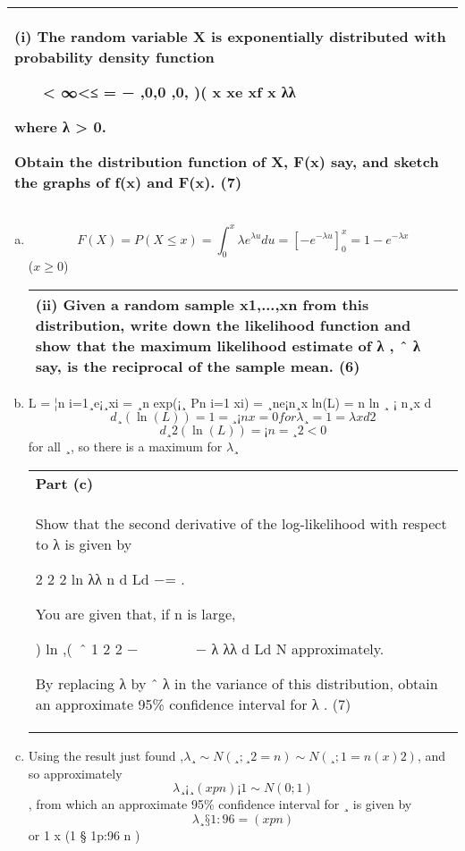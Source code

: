 \documentclass[a4paper,12pt]{article}
\begin{document}
  \begin{table}[ht!]
  \centering
  \begin{tabular}{|p{15cm}|}
  \hline
(i) The random variable X is exponentially distributed with probability density function 
 
   
  
< ∞<≤
=
−
,0,0 ,0,
)(
x xe
xf
x
λλ
 
 
  where λ > 0. 
 
  Obtain the distribution function of X, F(x) say, and sketch the graphs of f(x) and F(x). (7) 
 \\ \hline 
   \end{tabular}
 \end{table}
 



\begin{enumerate}[(a)]
 \item 
 
\[
F(X) = P(X \leq x) = \int^{x}_{0} \lambda e^{\lambda u} du
 = [-e^{-\lambda u}]^{x}_{0}  = 1-e^{-\lambda x}\] ($x \geq  0$)

  \begin{table}[ht!]
  \centering
  \begin{tabular}{|p{15cm}|}
  \hline 
 (ii) Given a random sample x1,...,xn from this distribution, write down the likelihood function and show that the maximum likelihood estimate of λ , ˆ λ  say, is the reciprocal of the sample mean. (6) 
\\ \hline 
   \end{tabular}
 \end{table}
 \item  L = ¦n i=1¸e¡¸xi = ¸n exp(¡¸
Pn
i=1
xi) = ¸ne¡n¸x ln(L) = n ln ¸ ¡ n¸x
d
\[d¸ (\ln(L)) = 1=¸ ¡ nx = 0 for \lambda¸ = 1=\lambda x d2\]
\[d¸2 (\ln(L)) = ¡n=¸2 < 0 \]for all ¸, 
so there is a maximum for $\lambda$¸


 
  \begin{table}[ht!]
  \centering
  \begin{tabular}{|p{15cm}|}
  \hline 
\noindent \textbf{Part (c)} \\Show that the second derivative of the log-likelihood with respect to 
λ
 is 
given by 
 
   2 2 2 ln λλ n d Ld −= . 
 
  You are given that, if n is large, 
 
   ) ln ,(~ˆ 1 2 2 −       − λ λλ d Ld N approximately. 
 
  By replacing λ by ˆ λ  in the variance of this distribution, obtain an approximate 95\% confidence interval for λ . (7) 
  
\\ \hline 
   \end{tabular}
 \end{table}
\item  Using the result just found ,$\lambda¸ \sim N(¸; ¸2=n) \sim N(¸; 1=n(x)2)$, and so approximately
\[\lambda¸
¡¸
(x
p
n)¡1 \sim N(0; 1)\], from which an approximate 95\% confidence interval for ¸ is given by
\[\lambda¸
§ 1:96=(x
p
n)\] or 1
x (1 § 1p:96
n )
\end{enumerate}
\end{document}
